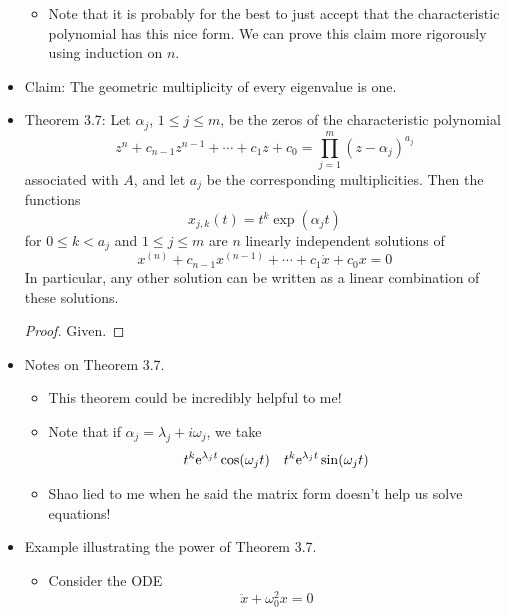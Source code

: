 \documentclass[../notes.tex]{subfiles}
\begin{document}
\begin{itemize}
    \begin{itemize}
        \item Note that it is probably for the best to just accept that the characteristic polynomial has this nice form. We can prove this claim more rigorously using induction on $n$.
    \end{itemize}
    \item Claim: The geometric multiplicity of every eigenvalue is one.
    \item Theorem 3.7: Let $\alpha_j$, $1\leq j\leq m$, be the zeros of the characteristic polynomial
    \begin{equation*}
        z^n+c_{n-1}z^{n-1}+\cdots+c_1z+c_0 = \prod_{j=1}^m(z-\alpha_j)^{a_j}
    \end{equation*}
    associated with $A$, and let $a_j$ be the corresponding multiplicities. Then the functions
    \begin{equation*}
        x_{j,k}(t) = t^k\exp(\alpha_jt)
    \end{equation*}
    for $0\leq k<a_j$ and $1\leq j\leq m$ are $n$ linearly independent solutions of
    \begin{equation*}
        x^{(n)}+c_{n-1}x^{(n-1)}+\cdots+c_1\dot{x}+c_0x = 0
    \end{equation*}
    In particular, any other solution can be written as a linear combination of these solutions.
    \begin{proof}
        Given.
    \end{proof}
    \item Notes on Theorem 3.7.
    \begin{itemize}
        \item This theorem could be incredibly helpful to me!
        \item Note that if $\alpha_j=\lambda_j+i\omega_j$, we take
        \begin{align*}
            t^k\e[\lambda_jt]\cos(\omega_jt)&&
            t^k\e[\lambda_jt]\sin(\omega_jt)
        \end{align*}
        \item Shao lied to me when he said the matrix form doesn't help us solve equations!
    \end{itemize}
    \item Example illustrating the power of Theorem 3.7.
    \begin{itemize}
        \item Consider the ODE
        \begin{equation*}
            \ddot{x}+\omega_0^2x = 0

\end{equation*}
\end{itemize}
\end{itemize}
\end{document}

